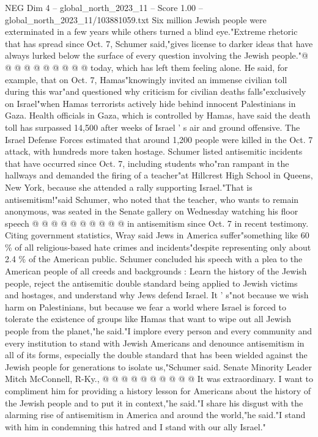 \begin{textsample}{NEG Dim 4 – global\_north\_2023\_11 – Score 1.00 – global\_north\_2023\_11/103881059.txt}
Six million Jewish people were exterminated in a few years while others turned a blind eye."Extreme rhetoric that has spread since Oct. 7, Schumer said,"gives license to darker ideas that have always lurked below the surface of every question involving the Jewish people."@ @ @ @ @ @ @ @ @ @ today, which has left them feeling alone.
He said, for example, that on Oct. 7, Hamas"knowingly invited an immense civilian toll during this war"and questioned why criticism for civilian deaths falls"exclusively on Israel"when Hamas terrorists actively hide behind innocent Palestinians in Gaza.
Health officials in Gaza, which is controlled by Hamas, have said the death toll has surpassed 14,500 after weeks of Israel ' s air and ground offensive.
The Israel Defense Forces estimated that around 1,200 people were killed in the Oct. 7 attack, with hundreds more taken hostage.
Schumer listed antisemitic incidents that have occurred since Oct. 7, including students who"ran rampant in the hallways and demanded the firing of a teacher"at Hillcrest High School in Queens, New York, because she attended a rally supporting Israel."That is antisemitism!"said Schumer, who noted that the teacher, who wants to remain anonymous, was seated in the Senate gallery on Wednesday watching his floor speech @ @ @ @ @ @ @ @ @ @ in antisemitism since Oct. 7 in recent testimony.
Citing government statistics, Wray said Jews in America suffer"something like 60 \% of all religious-based hate crimes and incidents"despite representing only about 2.4 \% of the American public.
Schumer concluded his speech with a plea to the American people of all creeds and backgrounds : Learn the history of the Jewish people, reject the antisemitic double standard being applied to Jewish victims and hostages, and understand why Jews defend Israel.
It ' s"not because we wish harm on Palestinians, but because we fear a world where Israel is forced to tolerate the existence of groups like Hamas that want to wipe out all Jewish people from the planet,"he said."I implore every person and every community and every institution to stand with Jewish Americans and denounce antisemitism in all of its forms, especially the double standard that has been wielded against the Jewish people for generations to isolate us,"Schumer said.
Senate Minority Leader Mitch McConnell, R-Ky., @ @ @ @ @ @ @ @ @ @ It was extraordinary.
I want to compliment him for providing a history lesson for Americans about the history of the Jewish people and to put it in context,"he said."I share his disgust with the alarming rise of antisemitism in America and around the world,"he said."I stand with him in condemning this hatred and I stand with our ally Israel."

\end{textsample}
